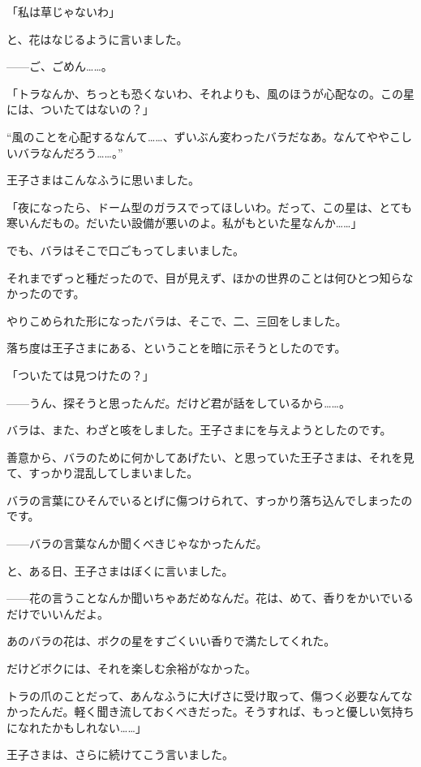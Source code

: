 「私は草じゃないわ」

と、花はなじるように言いました。

——ご、ごめん……。

「トラなんか、ちっとも恐くないわ、それよりも、風のほうが心配なの。この星には、ついたてはないの？」

“風のことを心配するなんて……、ずいぶん変わったバラだなあ。なんてややこしいバラなんだろう……。”

王子さまはこんなふうに思いました。

「夜になったら、ドーム型のガラスでってほしいわ。だって、この星は、とても寒いんだもの。だいたい設備が悪いのよ。私がもといた星なんか……」


でも、バラはそこで口ごもってしまいました。

それまでずっと種だったので、目が見えず、ほかの世界のことは何ひとつ知らなかったのです。


やりこめられた形になったバラは、そこで、二、三回をしました。

落ち度は王子さまにある、ということを暗に示そうとしたのです。

「ついたては見つけたの？」

——うん、探そうと思ったんだ。だけど君が話をしているから……。

バラは、また、わざと咳をしました。王子さまにを与えようとしたのです。

善意から、バラのために何かしてあげたい、と思っていた王子さまは、それを見て、すっかり混乱してしまいました。

バラの言葉にひそんでいるとげに傷つけられて、すっかり落ち込んでしまったのです。

——バラの言葉なんか聞くべきじゃなかったんだ。

と、ある日、王子さまはぼくに言いました。

——花の言うことなんか聞いちゃあだめなんだ。花は、めて、香りをかいでいるだけでいいんだよ。

あのバラの花は、ボクの星をすごくいい香りで満たしてくれた。

だけどボクには、それを楽しむ余裕がなかった。

トラの爪のことだって、あんなふうに大げさに受け取って、傷つく必要なんてなかったんだ。軽く聞き流しておくべきだった。そうすれば、もっと優しい気持ちになれたかもしれない……」

王子さまは、さらに続けてこう言いました。

